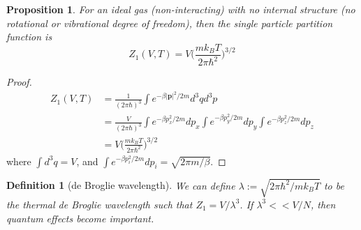 \documentclass[a4paper]{article}
\theoremstyle{new}
\newtheorem{defi}{Definition}[section]
\newtheorem{prop}{Proposition}[section]
\begin{document}
\begin{prop}
For an ideal gas (non-interacting) with no internal structure (no rotational or vibrational degree of freedom), then the single particle partition function is
\begin{equation}
Z_1(V,T)=V\bigg(\frac{mk_BT}{2\pi\hbar^2}\bigg)^{3/2}\label{spnonInteracting}
\end{equation}
\end{prop}
\begin{proof}
\begin{align}
Z_1(V,T)&=\frac{1}{(2\pi\hbar)^3}\int e^{-\beta |\mathbf{p}|^2/2m}d^3qd^3p\nonumber\\&=\frac{V}{(2\pi\hbar)^3}\int e^{-\beta p_x^2/2m}dp_x\int e^{-\beta p_y^2/2m}dp_y\int e^{-\beta p_z^2/2m}dp_z\nonumber\\&=V\bigg(\frac{mk_BT}{2\pi\hbar^2}\bigg)^{3/2}\nonumber
\end{align}
where $\int d^3q=V$, and $\int e^{-\beta p_i^2/2m}dp_i=\sqrt{2\pi m/\beta}$.
\end{proof}
\begin{defi}[de Broglie wavelength]
We can define $\lambda:=\sqrt{2\pi\hbar^2/mk_BT}$ to be the thermal de Broglie wavelength such that $Z_1=V/\lambda^3$. If $\lambda^3<<V/N$, then quantum effects become important.
\end{defi}
\end{document}
